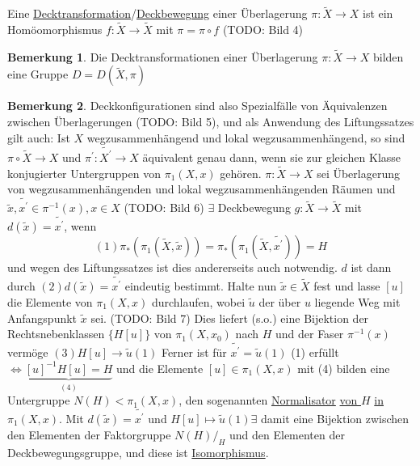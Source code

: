 \documentclass[a4paper,11pt,notitlepage]{report}
\theoremstyle{definition}
\newtheorem{remark}{Bemerkung}[chapter]
\newenvironment{definition}[1]{
	\begin{definitions}
	\marginnote{\emph{#1}}
}{\end{definitions}}
\begin{document}
\begin{definition}{Decktransformation}
	Eine \underline{Decktransformation}/\underline{Deckbewegung} einer Überlagerung $\pi \colon \widetilde{X} \rightarrow X$ ist ein Homöomorphismus $f \colon \widetilde{X} \rightarrow \widetilde{X}$ mit $\boxed{\pi = \pi \circ f}$ (TODO: Bild 4)
\end{definition}

\begin{remark}
	Die Decktransformationen einer Überlagerung $\pi \colon \widetilde{X} \rightarrow X$ bilden eine Gruppe $D=D(\widetilde{X}, \pi)$
\end{remark}

\begin{remark}
	Deckkonfigurationen sind also Spezialfälle von Äquivalenzen zwischen Überlagerungen (TODO: Bild 5), und als Anwendung des Liftungssatzes gilt auch:
	\newline
	Ist $X$ wegzusammenhängend und lokal wegzusammenhängend, so sind $\pi \circ \widetilde{X} \rightarrow X$ und $\pi^\prime \colon \widetilde{X^\prime} \rightarrow X$ äquivalent genau dann, wenn sie zur gleichen Klasse konjugierter Untergruppen von $\pi_1(X,x)$ gehören.
	\newline
	$\pi \colon \widetilde{X} \rightarrow X$ sei Überlagerung von wegzusammenhängenden und lokal wegzusammenhängenden Räumen und $\widetilde{x}, \widetilde{x^\prime} \in \pi^{-1}(x), x \in X$ (TODO: Bild 6)
	\newline
	$\exists$ Deckbewegung $g \colon \widetilde{X} \rightarrow \widetilde{X}$ mit $d(\widetilde{x}) = \widetilde{x^\prime}$, wenn 
	$$(1) \boxed{\pi_*(\pi_1(\widetilde{X}, \widetilde{x})) = \pi_*(\pi_1(\widetilde{X}, \widetilde{x^\prime})) = H}$$
	und wegen des Liftungssatzes ist dies andererseits auch notwendig.
	\newline
	$d$ ist dann durch $(2) \boxed{d(\widetilde{x})= \widetilde{x^\prime}}$ eindeutig bestimmt.
	\newline
	Halte nun $\widetilde{x} \in \widetilde{X}$ fest und lasse $[u]$ die Elemente von $\pi_1(X,x)$ durchlaufen, wobei $\widetilde{u}$ der über $u$ liegende Weg mit Anfangspunkt $\widetilde{x}$ sei.  (TODO: Bild 7)
	\newline
	Dies liefert (s.o.) eine Bijektion der Rechtsnebenklassen $\{H[u]\}$ von $\pi_1(X,x_0)$ nach $H$ und der Faser $\pi^{-1}(x)$ vermöge $(3) \boxed{H[u] \rightarrow \widetilde{u}(1)}$ \newline
	Ferner ist für $\widetilde{x^\prime} = \widetilde{u}(1)$ (1) erfüllt $\Leftrightarrow \underbrace{[u]^{-1}H[u]=H}_{(4)}$ und die Elemente $[u] \in \pi_1(X,x)$ mit (4) bilden eine Untergruppe $N(H) < \pi_1(X,x)$, den sogenannten \underline{Normalisator} \underline{von $H$} \underline{in $\pi_1(X,x)$}. Mit $d(\widetilde{x}) = \widetilde{x^\prime}$ und $H[u] \mapsto \widetilde{u}(1) \exists$ damit eine Bijektion zwischen den Elementen der Faktorgruppe $N(H)/_H$ und den Elementen der Deckbewegungsgruppe, und diese ist \underline{Isomorphismus}.
\end{remark}
\end{document}
